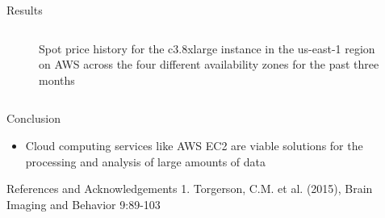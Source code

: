 \documentclass[final,hyperref={pdfpagelabels=false}]{beamer}
\begin{document}
\begin{frame}
\begin{columns}
\begin{column}{.5\textwidth}
{\begin{block}{Results}
\begin{column}{.47\textwidth}
\begin{figure}
                  \caption{\label{fig:spot_history}Spot price history for the c3.8xlarge instance in the us-east-1 region on AWS across the four different availability zones for the past three months}
              \end{figure}
          \end{column}
        \end{block}
        \begin{block}{Conclusion}
            \begin{itemize}
                \item Cloud computing services like AWS EC2 are viable solutions for the processing and analysis of large amounts of data
            \end{itemize}
        \end{block}
        \begin{block}{References and Acknowledgements}
            1. Torgerson, C.M. et al. (2015), Brain Imaging and Behavior 9:89-103\\

\end{block}}
\end{column}
\end{columns}
\end{frame}
\end{document}
